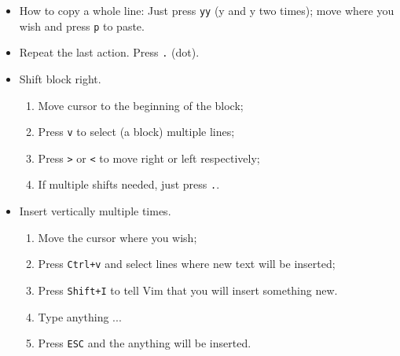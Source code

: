 \documentclass[a4paper,14pt]{article}
\begin{document}
\begin{itemize}

	\item How to copy a whole line: Just press \texttt{yy} (y and y two times); move where you wish and press \texttt{p} to paste.

        \item Repeat the last action. Press \texttt{.} (dot). 
	
	\item  Shift block right. \begin{enumerate}
		
			\item Move cursor to the beginning of the block;
			\item Press \texttt{v} to select (a block) multiple lines;
			\item Press \texttt{>} or \texttt{<} to move right or left respectively;
			\item If multiple shifts needed, just press \texttt{.}.
		\end{enumerate}


	\item  Insert vertically multiple times. \begin{enumerate}
		\item Move the cursor where you wish;
		\item Press \texttt{Ctrl+v} and select lines where new text will be inserted; 
		\item Press \texttt{Shift+I} to tell Vim that you will insert something new. 
		\item Type anything ... 
		\item Press \texttt{ESC} and the anything will be inserted.
		\end{enumerate}




\end{itemize}
\end{document}

